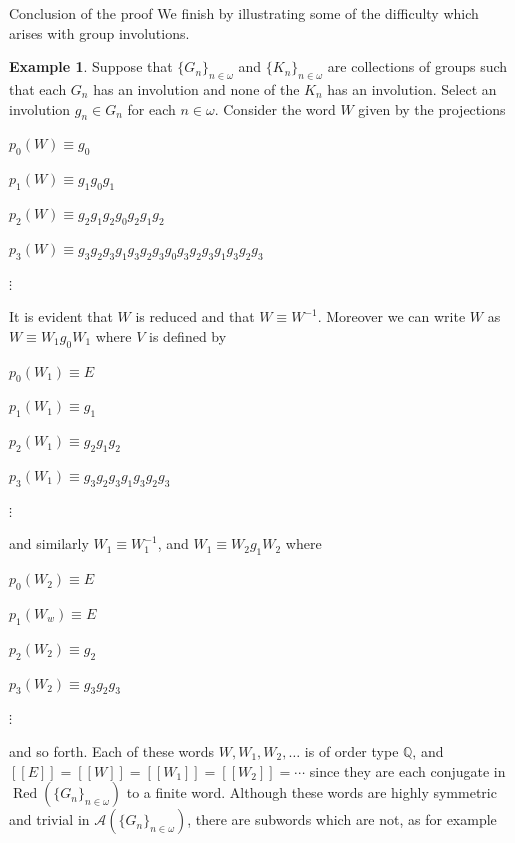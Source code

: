 \documentclass{amsart}
\theoremstyle{definition}\newtheorem{theorem}{Theorem}
\theoremstyle{definition}\newtheorem*{A}{Main Theorem}
\theoremstyle{definition}\newtheorem*{B}{Theorem \ref{elementaryequiv}}
\theoremstyle{definition}\newtheorem*{C}{Theorem \ref{continuous}}
\theoremstyle{definition}\newtheorem*{D}{Theorem \ref{bigisomorphism2}}
\theoremstyle{definition}\newtheorem{bigtheorem}{Main Theorem}
\numberwithin{theorem}{section}
\theoremstyle{definition}\newtheorem{corollary}[theorem]{Corollary}
\theoremstyle{definition}\newtheorem{proposition}[theorem]{Proposition}
\theoremstyle{definition}\newtheorem{definition}[theorem]{Definition}
\theoremstyle{definition}\newtheorem{question}[theorem]{Question}
\theoremstyle{definition}\newtheorem{example}[theorem]{Example}
\theoremstyle{definition}\newtheorem{remark}[theorem]{Remark}
\theoremstyle{definition}\newtheorem{note}[theorem]{Note}
\theoremstyle{definition}\newtheorem{lemma}[theorem]{Lemma}
\theoremstyle{definition}\newtheorem{fact}[theorem]{Fact}
\theoremstyle{definition}\newtheorem{define}[theorem]{Definition}
\theoremstyle{definition}\newtheorem{claim}[theorem]{Claim}
\theoremstyle{definition}\newtheorem{obs}[theorem]{Observation}
\theoremstyle{definition}\newtheorem{definitions}[theorem]{Definitions}
\newcommand{\Red}{\operatorname{Red}}
\begin{document}
\begin{section}{Conclusion of the proof}
We finish by illustrating some of the difficulty which arises with group involutions.

\begin{example}\label{nastyword}  Suppose that $\{G_n\}_{n \in \omega}$ and $\{K_n\}_{n \in \omega}$ are collections of groups such that each $G_n$ has an involution and none of the $K_n$ has an involution.  Select an involution $g_n \in G_n$ for each $n \in \omega$.  Consider the word $W$ given by the projections

\begin{center}

$p_0(W) \equiv g_0$

$p_1(W) \equiv g_1 g_0 g_1$

$p_2(W) \equiv g_2 g_1 g_2 g_0 g_2 g_1 g_2$

$p_3(W) \equiv g_3 g_2 g_3 g_1 g_3 g_2 g_3 g_0 g_3 g_2 g_3 g_1 g_3 g_2 g_3$

$\vdots$

\end{center}

\noindent It is evident that $W$ is reduced and that $W \equiv W^{-1}$.  Moreover we can write $W$ as $W \equiv W_1g_0W_1$ where $V$ is defined by

\begin{center}

$p_0(W_1) \equiv E$

$p_1(W_1) \equiv g_1$

$p_2(W_1) \equiv g_2 g_1 g_2$

$p_3(W_1) \equiv g_3 g_2 g_3 g_1 g_3 g_2 g_3$

$\vdots$

\end{center}

\noindent and similarly $W_1 \equiv W_1^{-1}$, and $W_1 \equiv W_2g_1W_2$ where

\begin{center}

$p_0(W_2) \equiv E$

$p_1(W_w) \equiv E$

$p_2(W_2) \equiv g_2$

$p_3(W_2) \equiv g_3 g_2 g_3$

$\vdots$

\end{center}

\noindent and so forth.  Each of these words $W, W_1, W_2, \ldots$ is of order type $\mathbb{Q}$, and $[[E]] = [[W]] = [[W_1]] = [[W_2]] = \cdots$ since they are each conjugate in $\Red(\{G_n\}_{n \in \omega})$ to a finite word.  Although these words are highly symmetric and trivial in $\mathcal{A}(\{G_n\}_{n \in \omega})$, there are subwords which are not, as for example


\end{example}
\end{section}
\end{document}
